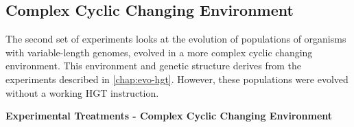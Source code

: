 \documentclass[PhD]{msu-thesis}
\begin{document}
\subsection{Complex Cyclic Changing Environment}
The second set of experiments looks at the evolution of populations of organisms with variable-length genomes, evolved in a more complex cyclic changing environment. This environment and genetic structure derives from the experiments described in \ref{chap:evo-hgt}. However, these populations were evolved without a working HGT instruction.

	\begin{table}[]
	\centering
	\caption{\textbf{Experimental Treatments - Complex Cyclic Changing Environment}}
	\label{cel-treatments-h}


\end{table}
\end{document}
